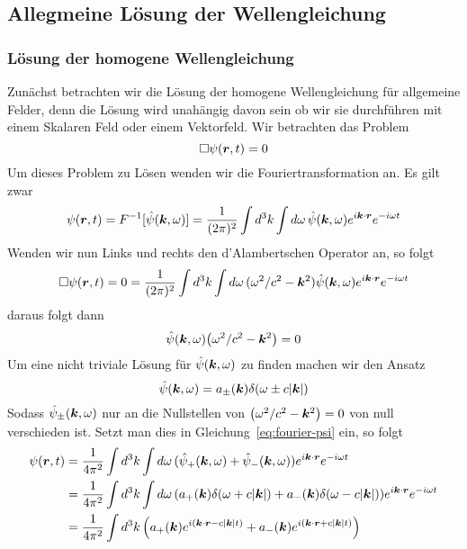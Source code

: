 \subsection{Allegmeine Lösung der Wellengleichung}%
\label{sub:loesung-wellengleichung}
\subsubsection{Lösung der homogene Wellengleichung}%
\label{ssub:homogene-wellengleichung}
Zunächst betrachten wir die Lösung der homogene Wellengleichung für allgemeine Felder, denn die Lösung wird unahängig davon sein ob wir sie durchführen mit einem Skalaren Feld oder einem Vektorfeld. Wir betrachten das Problem
\begin{equation}
  \Box \psi(\vb*r, t) = 0
\end{equation}
Um dieses Problem zu Lösen wenden wir die Fouriertransformation an. Es gilt zwar
\begin{equation}
  \label{eq:fourier-psi}
  \psi(\vb*r, t) = F^{-1}[\hat{\psi}(\vb*k, \omega)]
  = \frac{1}{(2\pi)^2} \int d^3k \int d\omega \,
  \hat{\psi}(\vb*k,\omega) e^{i\vb*k\cdot\vb*r} e^{-i\omega t}
\end{equation}
Wenden wir nun Links und rechts den d'Alambertschen Operator an, so folgt
\begin{equation}
  \Box \psi(\vb*r, t) = 0 
  = \frac{1}{(2\pi)^2} \int d^3k \int d\omega \,
  (\omega^2/c^2-\vb*k^2)\hat{\psi}(\vb*k,\omega) e^{i\vb*k\cdot\vb*r} e^{-i\omega t}
\end{equation}
daraus folgt dann
\begin{equation}
  \hat{\psi}(\vb*k, \omega)\qty(\omega^2/c^2-\vb*k^2)=0
\end{equation}
Um eine nicht triviale Lösung für 
$\hat{\psi}(\vb*k,\omega)$ zu finden machen wir den Ansatz
\begin{equation}
  \hat{\psi}(\vb*k, \omega)=a_\pm(\vb*k)\delta(\omega\pm c\abs{\vb*k})
\end{equation}
Sodass $\hat{\psi}_\pm(\vb*k, \omega)$ nur an die Nullstellen von $\qty(\omega^2/c^2-\vb*k^2)=0$ von null verschieden ist. Setzt man dies in
Gleichung~\ref{eq:fourier-psi} ein, so folgt
\begin{equation}
  \begin{split}
    \psi(\vb*r, t) 
    &=
    \frac{1}{4\pi^2} 
    \int d^3k \int d\omega \,
    (\hat\psi_+(\vb*k, \omega) + \hat\psi_-(\vb*k, \omega) )
    e^{i\vb*k\cdot\vb*r}
    e^{-i\omega t}\\
    &=
    \frac{1}{4\pi^2} 
    \int d^3k \int d\omega \,
    (a_+(\vb*k)\delta(\omega+c\abs{\vb*k})+a_-(\vb*k)\delta(\omega-c\abs{\vb*k})) 
    e^{i\vb*k\cdot\vb*r}
    e^{-i\omega t}\\
    &=
    \frac{1}{4\pi^2} 
    \int d^3k \,
    \qty(a_+(\vb*k)e^{i(\vb*k\cdot\vb*r-c\abs{\vb*k}t)}+
    a_-(\vb*k)e^{i(\vb*k\cdot\vb*r+c\abs{\vb*k}t)})
  \end{split}
\end{equation}
